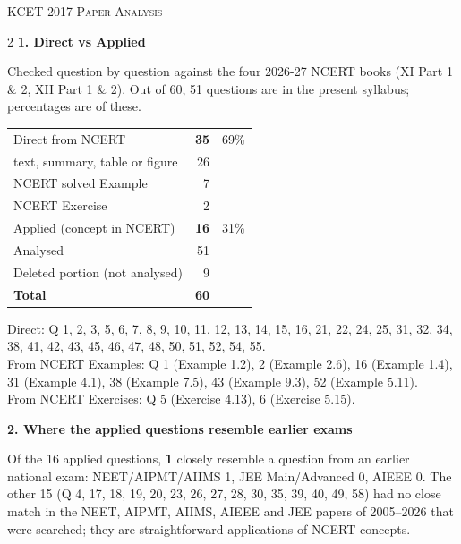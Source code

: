 \begin{center}{}\par
{\fontsize{20}{24}\selectfont\color{navy}\scshape KCET 2017 \textperiodcentered{} Paper Analysis}\par
{\color{gilt}}\end{center}
\vspace{4pt}
\begin{multicols}{2}
\textbf{\color{crimson}1. Direct vs Applied}\par\smallskip
{\footnotesize Checked question by question against the four 2026-27 NCERT books (XI Part 1 \& 2, XII Part 1 \& 2). Out of 60, 51 questions are in the present syllabus; percentages are of these.}\par\smallskip
\begin{tabular}{@{}lrr@{}}\toprule
Direct from NCERT & \textbf{35} & 69\%\\
\quad text, summary, table or figure & 26 &\\
\quad NCERT solved Example & 7 &\\
\quad NCERT Exercise & 2 &\\
Applied (concept in NCERT) & \textbf{16} & 31\%\\\midrule
Analysed & 51 &\\
Deleted portion (not analysed) & 9 &\\\midrule
\textbf{Total} & \textbf{60} &\\\bottomrule\end{tabular}\par\smallskip
{\footnotesize Direct: Q 1, 2, 3, 5, 6, 7, 8, 9, 10, 11, 12, 13, 14, 15, 16, 21, 22, 24, 25, 31, 32, 34, 38, 41, 42, 43, 45, 46, 47, 48, 50, 51, 52, 54, 55.\\ From NCERT Examples: Q 1 (Example 1.2), 2 (Example 2.6), 16 (Example 1.4), 31 (Example 4.1), 38 (Example 7.5), 43 (Example 9.3), 52 (Example 5.11).\\ From NCERT Exercises: Q 5 (Exercise 4.13), 6 (Exercise 5.15).}\par\medskip
\textbf{\color{crimson}2. Where the applied questions resemble earlier exams}\par\smallskip
Of the 16 applied questions, \textbf{1} closely resemble a question from an earlier national exam:
NEET/AIPMT/AIIMS 1, JEE Main/Advanced 0, AIEEE 0. The other 15 (Q 4, 17, 18, 19, 20, 23, 26, 27, 28, 30, 35, 39, 40, 49, 58) had no close match in the NEET, AIPMT, AIIMS, AIEEE and JEE papers of 2005--2026 that were searched; they are straightforward applications of NCERT concepts.\par

\end{multicols}
